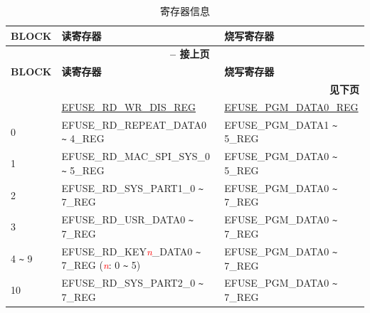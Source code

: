 \begin{longtable}[c]{|l|l|l|}
\caption{寄存器信息}
\label{tab:efuse-softw-read-para}
    \\\hline
    \rowcolor{lightgray}
  \textbf{BLOCK} & \textbf{读寄存器} & \textbf{烧写寄存器}\\
    \endfirsthead
    \multicolumn{3}{c}{\bfseries \tablename\ \thetable{} -- 接上页}\\\hline
    \rowcolor{lightgray}
  \textbf{BLOCK} & \textbf{读寄存器} & \textbf{烧写寄存器}\\
    \endhead
    \multicolumn{3}{r}{\textbf{见下页}} \\
    \endfoot
    \endlastfoot
    \hline
0 & \hyperref[regdesc:EFUSERDWRDISREG]{EFUSE\_RD\_WR\_DIS\_REG} & \hyperref[regdesc:EFUSEPGMDATA0REG]{EFUSE\_PGM\_DATA0\_REG} \\\hline
0 & EFUSE\_RD\_REPEAT\_DATA0 \verb+~+ 4\_REG & EFUSE\_PGM\_DATA1 \verb+~+ 5\_REG \\\hline
1 & EFUSE\_RD\_MAC\_SPI\_SYS\_0 \verb+~+ 5\_REG & EFUSE\_PGM\_DATA0 \verb+~+ 5\_REG \\\hline
2 & EFUSE\_RD\_SYS\_PART1\_0 \verb+~+ 7\_REG & EFUSE\_PGM\_DATA0 \verb+~+ 7\_REG \\\hline
3 & EFUSE\_RD\_USR\_DATA0 \verb+~+ 7\_REG & EFUSE\_PGM\_DATA0 \verb+~+ 7\_REG \\ \hline
4 \verb+~+ 9 & EFUSE\_RD\_KEY\textcolor{red}{\it{n}}\_DATA0 \verb+~+ 7\_REG (\textcolor{red}{\it{n}}: 0 \verb+~+ 5) & EFUSE\_PGM\_DATA0 \verb+~+ 7\_REG \\\hline
10 & EFUSE\_RD\_SYS\_PART2\_0 \verb+~+ 7\_REG & EFUSE\_PGM\_DATA0 \verb+~+ 7\_REG \\\hline
\end{longtable}
